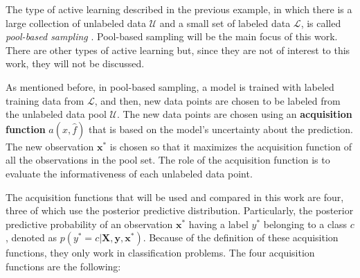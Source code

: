 
The type of active learning described in the previous example, in which there is a large collection of unlabeled data $\mathcal{U}$ and a small set of labeled data $\mathcal{L}$, is called \textit{pool-based sampling} \cite{settles.tr09}. Pool-based sampling will be the main focus of this work. There are other types of active learning but, since they are not of interest to this work, they will not be discussed.

As mentioned before, in pool-based sampling, a model is trained with labeled training data from $\mathcal{L}$, and then, new data points are chosen to be labeled from the unlabeled data pool $\mathcal{U}$. The new data points are chosen using an \textbf{acquisition function} $a(x, \hat{f})$ that is based on the model's uncertainty about the prediction. The new observation $\boldsymbol{x}^*$ is chosen so that it maximizes the acquisition function of all the observations in the pool set. The role of the acquisition function is to evaluate the informativeness of each unlabeled data point.

The acquisition functions that will be used and compared in this work are four, three of which use the posterior predictive distribution. Particularly, the posterior predictive probability of an observation $\boldsymbol{x}^*$ having a label $y^*$ belonging to a class $c$, denoted as $p(y^* = c | \boldsymbol{X}, \boldsymbol{y}, \boldsymbol{x}^*)$. Because of the definition of these acquisition functions, they only work in classification problems. The four acquisition functions are the following:

